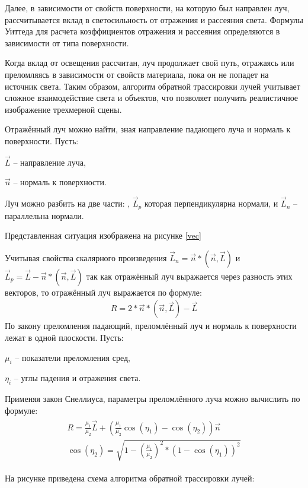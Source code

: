 Далее, в зависимости от свойств поверхности, на которую был направлен луч, рассчитывается вклад в светосильность от отражения и рассеяния света. Формулы Уиттеда для расчета коэффициентов отражения и рассеяния определяются в зависимости от типа поверхности.


Когда вклад от освещения рассчитан, луч продолжает свой путь, отражаясь или преломляясь в зависимости от свойств материала, пока он не попадет на источник света. Таким образом, алгоритм обратной трассировки лучей учитывает сложное взаимодействие света и объектов, что позволяет получить реалистичное изображение трехмерной сцены.

Отражённый луч можно найти, зная направление падающего луча и нормаль к поверхности.
Пусть:


 $\vec L$ – направление луча, 
 
 
 $\vec n$ – нормаль к поверхности. 
 
 
Луч можно разбить на две части: , $\vec L_p$ которая перпендикулярна нормали, и $\vec L_n$ -- параллельна нормали.


Представленная ситуация изображена на рисунке \ref{vec}



Учитывая свойства скалярного произведения $\vec L_n = \vec n * (\vec n,\vec  L)$ и $\vec L_p = \vec L - \vec n * (\vec n, \vec L)$ так как отражённый луч выражается через разность этих векторов, то отражённый луч выражается по формуле:
\begin{align}
R = 2 *\vec  n * (\vec n, \vec L) - \vec L
\end{align}
По закону преломления падающий, преломлённый луч и нормаль к поверхности лежат в одной плоскости. Пусть:


$\mu_i$ – показатели преломления сред, 


$\eta_i$ – углы падения и отражения света. 


Применяя закон Снеллиуса, параметры преломлённого луча можно вычислить по формуле:
\begin{align}
	\begin{gathered}
R = \frac{\mu_1}{\mu_2}\vec L + (\frac{\mu_1}{\mu_2}\cos(\eta_1) - \cos(\eta_2)) \vec n\\
\cos(\eta_2) = \sqrt{1 - (\frac{\mu_1}{\mu_2})^2 * (1 - \cos(\eta_1))^2}
	\end{gathered}
\end{align}

На рисунке приведена схема алгоритма обратной трассировки лучей:
